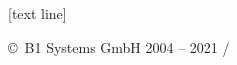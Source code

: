 {
[text line]{\tiny{\strut\color{gray} \copyright\ B1 Systems GmbH 2004 -- 2021 \hfill \inserttitle \hfill \insertframenumber{}/\inserttotalframenumber{}}}
}


